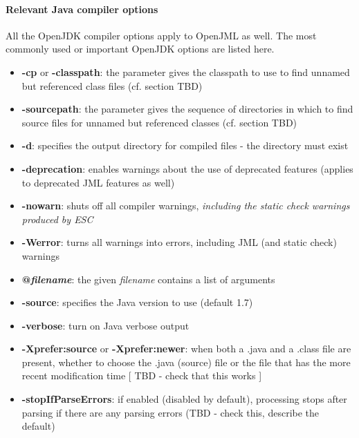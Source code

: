 \paragraph{Relevant Java compiler options}
All the OpenJDK compiler options apply to OpenJML as well. The most commonly used or important OpenJDK options are listed here.
\begin{itemize}[noitemsep,nolistsep]
\item \textbf{-cp} or \textbf{-classpath}: the parameter gives the classpath to use to find unnamed but referenced class files (cf. section TBD)
\item \textbf{-sourcepath}: the parameter gives the sequence of directories in which to find source files for unnamed but referenced classes (cf. section TBD)
\item \textbf{-d}: specifies the output directory for compiled files - the directory must exist
\item \textbf{-deprecation}: enables warnings about the use of deprecated features (applies to deprecated JML features as well)
\item \textbf{-nowarn}: shuts off all compiler warnings, \textit{including the static check warnings produced by ESC}
\item \textbf{-Werror}: turns all warnings into errors, including JML (and static check) warnings
\item \textbf{@\textit{filename}}: the given \textit{filename} contains a list of arguments
\item \textbf{-source}: specifies the Java version to use (default 1.7)
\item \textbf{-verbose}: turn on Java verbose output
\item \textbf{-Xprefer:source} or \textbf{-Xprefer:newer}: when both a .java and a .class file are present, 
whether to choose the .java (source) file or the file that has the more recent modification time [ TBD - check that this works ]
\item \textbf{-stopIfParseErrors}: if enabled (disabled by default), processing stops after parsing if there are any parsing errors (TBD - check this, describe the default)
\end{itemize}

